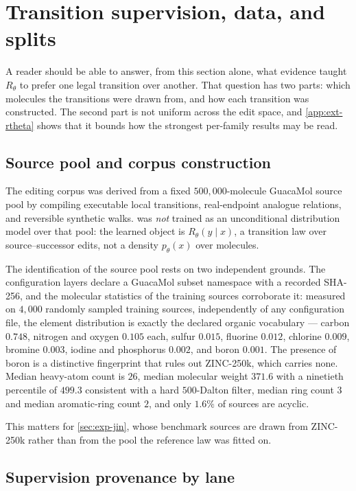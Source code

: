 \section{Transition supervision, data, and splits}
\label{app:data}

A reader should be able to answer, from this section alone, what evidence taught $R_\theta$ to prefer one legal transition over another. That question has two parts: which molecules the transitions were drawn from, and how each transition was constructed. The second part is not uniform across the edit space, and \cref{app:ext-rtheta} shows that it bounds how the strongest per-family results may be read.

\subsection{Source pool and corpus construction}

The editing corpus was derived from a fixed $500{,}000$-molecule GuacaMol source pool by compiling executable local transitions, real-endpoint analogue relations, and reversible synthetic walks. \method{} was \emph{not} trained as an unconditional distribution model over that pool: the learned object is $R_\theta(y\mid x)$, a transition law over source--successor edits, not a density $p_\theta(x)$ over molecules.

The identification of the source pool rests on two independent grounds. The configuration layers declare a GuacaMol subset namespace with a recorded SHA-256, and the molecular statistics of the training sources corroborate it: measured on $4{,}000$ randomly sampled training sources, independently of any configuration file, the element distribution is exactly the declared organic vocabulary --- carbon $0.748$, nitrogen and oxygen $0.105$ each, sulfur $0.015$, fluorine $0.012$, chlorine $0.009$, bromine $0.003$, iodine and phosphorus $0.002$, and boron $0.001$. The presence of boron is a distinctive fingerprint that rules out ZINC-250k, which carries none. Median heavy-atom count is $26$, median molecular weight $371.6$ with a ninetieth percentile of $499.3$ consistent with a hard $500$-Dalton filter, median ring count $3$ and median aromatic-ring count $2$, and only $1.6\%$ of sources are acyclic.

This matters for \cref{sec:exp-jin}, whose benchmark sources are drawn from ZINC-250k rather than from the pool the reference law was fitted on.

\subsection{Supervision provenance by lane}

